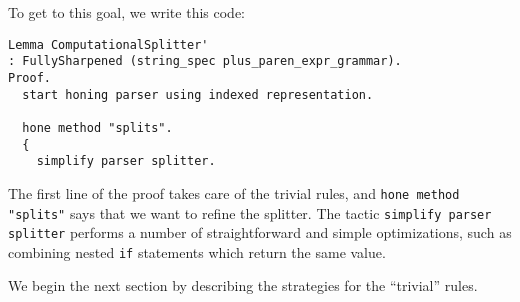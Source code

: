      To get to this goal, we write this code:
\begin{verbatim}
Lemma ComputationalSplitter'
: FullySharpened (string_spec plus_paren_expr_grammar).
Proof.
  start honing parser using indexed representation.

  hone method "splits".
  {
    simplify parser splitter.
\end{verbatim}
      The first line of the proof takes care of the trivial rules, and \verb|hone method "splits"| says that we want to refine the splitter.  The tactic \verb|simplify parser splitter| performs a number of straightforward and simple optimizations, such as combining nested \verb|if| statements which return the same value.
      
      We begin the next section by describing the strategies for the ``trivial'' rules.
